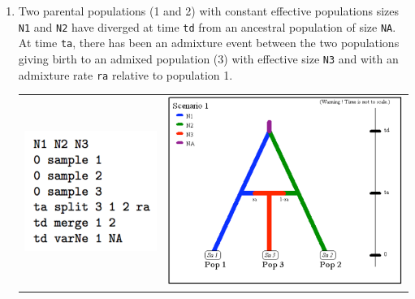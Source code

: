 \begin{enumerate}
\item Two parental populations (1 and 2) with constant effective populations
sizes \texttt{N1} and \texttt{N2} have diverged at time \texttt{td}
from an ancestral population of size \texttt{NA}. At time \texttt{ta},
there has been an admixture event between the two populations giving
birth to an admixed population (3) with effective size \texttt{N3}
and with an admixture rate \texttt{ra} relative to population 1.\\



\begin{center}
\begin{tabular}{cc}
\includegraphics[scale=0.5]{code_scenario_03}  & \includegraphics[scale=0.35]{scenario_03} \tabularnewline
\end{tabular}
\par\end{center}


\end{enumerate}
